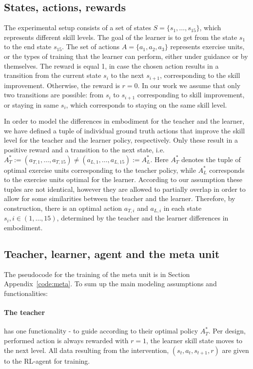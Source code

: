 \documentclass{article}
\begin{document}
\subsection{States, actions, rewards}
The experimental setup consists of a set of states $S=\{s_1, \ldots, s_{15}\}$, which represents different skill levels.  The goal of the learner is to get from the state $s_1$ to the end state $s_{15}$. The set of actions $A= \{a_1,a_2,a_3\}$ represents exercise units, or the types of training that the learner can perform, either under guidance or by themselves.   The reward is equal 1,  in case the chosen action results in a transition from the current state $s_i$ to the next $s_{i+1}$, corresponding to the skill improvement. Otherwise, the reward is $r=0$.   In our work we assume that only two transitions are possible:  from $s_i$ to $s_{i+1}$  corresponding to skill improvement, or staying in same $s_i$, which  corresponds to staying on the same skill level.

In order to model the differences in embodiment for the teacher and the learner, we have defined a tuple of individual ground truth actions that improve the skill level for the teacher and the learner policy, respectively. Only these result in a positive reward and a  transition to the next state, i.e. 
$A^*_T:= (a_{T,1},\ldots, a_{T,15}) \neq (a_{L,1}, \ldots, a_{L,15}):= A^*_L$.  Here  $A^*_T$ denotes the tuple of optimal exercise units corresponding to the teacher policy, while $A^*_L$ corresponds to the exercise units optimal for the learner.  According to our assumption these tuples are not identical, however they are allowed to partially  overlap in order to allow for some similarities between the teacher and the learner.  
 Therefore, by construction, there is an optimal  action $a_{T,i}$  and $a_{L,i}$  in each state $s_i, i \in (1,\ldots, 15)$, determined by the teacher and the learner differences in embodiment.   
 
 \subsection{Teacher, learner, agent and the meta unit}
 The pseudocode for the training of the meta unit is in Section  Appendix~\ref{code:meta}.
To sum up the main modeling assumptions and functionalities:

    \paragraph{The \textbf{teacher}} has one functionality - to guide according to their optimal policy $A^*_T$. Per design,  performed action is always rewarded with $r=1$, the learner skill state moves to the next level.  All data resulting from the intervention, $(s_t, a_t, s_{t+1}, r)$ are given to the RL-agent for training. 
    
\end{document}
